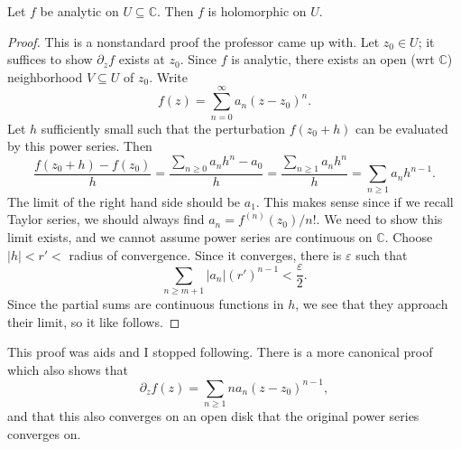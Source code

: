 \begin{theorem}\label{1.1.13}
	Let $f$ be analytic on $U\subseteq \mathbb{C} $. Then $f$ is holomorphic on $U$.
\end{theorem}
\begin{proof}
	This is a nonstandard proof the professor came up with. Let $z_0\in U$; it suffices to show $\partial _zf$ exists at $z_0$. Since $f$ is analytic, there exists an open (wrt $\mathbb{C} $) neighborhood $V\subseteq U$ of $z_0$. Write
	\[
		f(z)=\sum_{n=0}^{\infty} a_n(z-z_0)^n
	.\]
	Let $h$ sufficiently small such that the perturbation $f(z_0+h)$ can be evaluated by this power series. Then
	\[
		\frac{f(z_0+h)-f(z_0)}{h} =\frac{\sum_{n\geq 0} a_nh^n-a_0}{h} =\frac{\sum_{n\geq 1} a_nh^n}{h}=\sum_{n\geq 1} a_nh^{n-1} 
	.\]
	The limit of the right hand side should be $a_1$. This makes sense since if we recall Taylor series, we should always find $a_n=f^{(n)} (z_0) /n!$. We need to show this limit exists, and we cannot assume power series are continuous on $\mathbb{C} $. Choose $\left| h \right| <r'<$ radius of convergence. Since it converges, there is $\varepsilon $ such that
	\[
		\sum_{n\geq m+1} \left| a_n \right| (r')^{n-1} <\frac{\varepsilon }{2} 
	.\]
	Since the partial sums are continuous functions in $h$, we see that they approach their limit, so it like follows.
\end{proof}

This proof was aids and I stopped following. There is a more canonical proof which also shows that
\[
	\partial _zf(z)=\sum_{n\geq 1} na_n(z-z_0)^{n-1} ,
\]
and that this also converges on an open disk that the original power series converges on.
